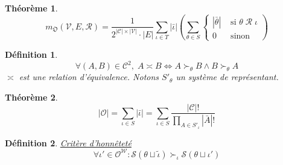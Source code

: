 \documentclass[french,11pt,a4paper]{article}
\newtheorem{definition}{Définition}
\newtheorem{theoreme}{Théorème}
\newcommand{\mc}[1]{\ensuremath{\mathcal{#1}} }  %
\begin{document}
	\begin{theoreme}
		\begin{equation}
			m_\mathfrak{O}(\mc{V}, E, \mc{R}) = 
			\frac{1}{ 2^{|\mc{C}| \times |\mc{V}|} \cdot |E| }
			\sum_{\iota \in T} \left|\bar{\iota}\right|
			\left(
			\sum_{\theta \in S} 
			\left\{\begin{matrix}
				\left|\bar{\theta}\right| &\text{ si } \theta \;\mc{R}\; \iota \\
				0 &\text{ sinon}
			\end{matrix}\right.
			\right)
		\end{equation}
	\end{theoreme}
	
	\begin{definition}
		\begin{equation}
			\forall \left(A,B\right) \in \mc{C}^2\!, \;
			A \asymp B
			\iff A \succ_\theta B \wedge B \succ_\theta A
		\end{equation}
		$\asymp$ est une relation d'équivalence. Notons $S'_\theta$ un système de représentant.
	\end{definition}
	
	\begin{theoreme}
		\begin{equation}
			\left| \mc{O} \right|
			= \sum_{\iota \in S} \left|\bar{\iota}\right|
				= \sum_{\iota \in S} \frac{
					\left|\mc{C}\right| !
				}{ \displaystyle
					\prod_{A \in S'_\iota} \left|\bar{A}\right| !
				}
		\end{equation}
	\end{theoreme}
	
	\begin{definition}
		\underline{Critère d'honnêteté}
		\begin{equation}
			\forall \iota' \in \mc{O}^\mc{W} : \mathscr{S}(\theta \sqcup \tilde{\iota}) \succ_\iota \mathscr{S} (\theta \sqcup \iota')
		\end{equation}
	\end{definition}
\end{document}
